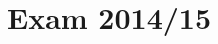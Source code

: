 \setcounter{section}{14}
\section{Exam 2014/15}
{
\renewcommand{\thesubsubsection}{\thesubsection\alph{subsubsection}}

}